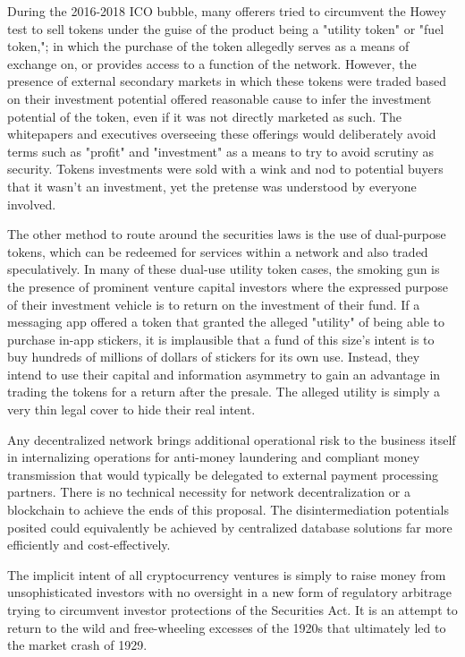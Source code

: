 During the 2016-2018 ICO bubble, many offerers tried to circumvent the Howey
test to sell tokens under the guise of the product being a "utility token" or
"fuel token,"; in which the purchase of the token allegedly serves as a means of
exchange on, or provides access to a function of the network. However, the
presence of external secondary markets in which these tokens were traded based
on their investment potential offered reasonable cause to infer the investment
potential of the token, even if it was not directly marketed as such. The
whitepapers and executives overseeing these offerings would deliberately avoid
terms such as "profit" and "investment" as a means to try to avoid scrutiny as
security. Tokens investments were sold with a wink and nod to potential buyers
that it wasn't an investment, yet the pretense was understood by everyone
involved.


The other method to route around the securities laws is the use of dual-purpose
tokens, which can be redeemed for services within a network and also traded
speculatively. In many of these dual-use utility token cases, the smoking gun is
the presence of prominent venture capital investors where the expressed purpose
of their investment vehicle is to return on the investment of their fund. If a
messaging app offered a token that granted the alleged "utility" of being able
to purchase in-app stickers, it is implausible that a fund of this size's intent
is to buy hundreds of millions of dollars of stickers for its own use. Instead,
they intend to use their capital and information asymmetry to gain an advantage
in trading the tokens for a return after the presale. The alleged utility is
simply a very thin legal cover to hide their real intent.

Any decentralized network brings additional operational risk to the business
itself in internalizing operations for anti-money laundering and compliant money
transmission that would typically be delegated to external payment processing
partners. There is no technical necessity for network decentralization or a
blockchain to achieve the ends of this proposal. The disintermediation
potentials posited could equivalently be achieved by centralized database
solutions far more efficiently and cost-effectively.

The implicit intent of all cryptocurrency ventures is simply to raise money from
unsophisticated investors with no oversight in a new form of regulatory
arbitrage trying to circumvent investor protections of the Securities Act. It is
an attempt to return to the wild and free-wheeling excesses of the 1920s that
ultimately led to the market crash of 1929.
